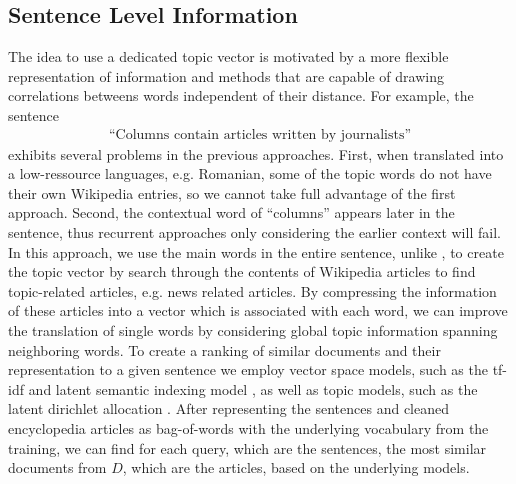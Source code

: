 \documentclass[a4paper]{article}
\begin{document}
\subsection{Sentence Level Information} \label{sec:sentence-level}
The idea to use a dedicated topic vector is motivated by a more flexible representation of information and methods that are capable of drawing correlations betweens words independent of their distance.
For example, the sentence 
\begin{align}
\text{``Columns contain articles written by journalists''}
\end{align}
exhibits several problems in the previous approaches. First, when translated into a low-ressource languages, e.g. Romanian, some of the topic words do not have their own Wikipedia entries, so we cannot take full advantage of the first approach. Second, the contextual word of ``columns'' appears later in the sentence, thus recurrent approaches only considering the earlier context will fail. 
In this approach, we use the main words in the entire sentence, unlike \cite{mikolov2012context}, to create the topic vector by search through the contents of Wikipedia articles to find topic-related articles, e.g. news related articles. By compressing the information of these articles into a vector which is associated with each word, we can improve the translation of single words by considering global topic information spanning neighboring words. 
To create a ranking of similar documents and their representation to a given sentence we employ vector space models, such as the tf-idf \cite{salton1986introduction} and latent semantic indexing model \cite{bradford2008empirical}, as well as topic models, such as the latent dirichlet allocation \cite{blei2003latent}. After representing the sentences and cleaned encyclopedia articles as bag-of-words with the underlying vocabulary from the training, we can find for each query, which are the sentences, the most similar documents from $D$, which are the articles,  based on the underlying models.
\end{document}
